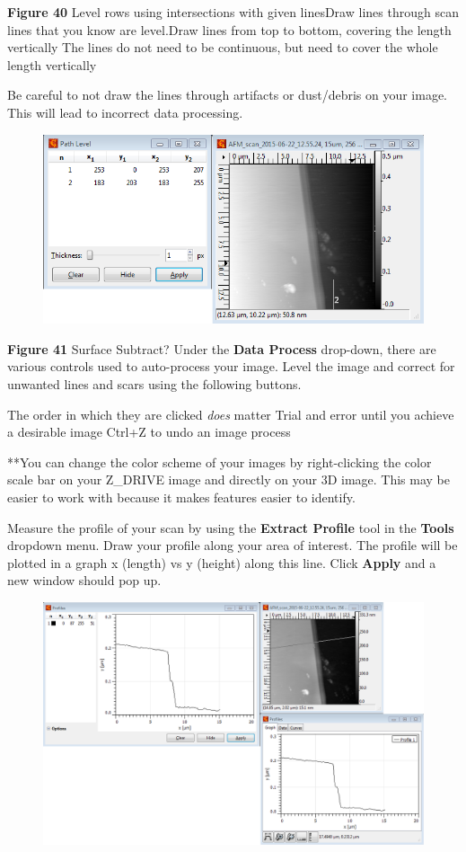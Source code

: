 \documentclass{../lab}
\begin{document}
\textbf{Figure 40}
 Level rows using intersections with given linesDraw lines through scan lines that you know are level.Draw lines from top to bottom, covering the length vertically
The lines do not need to be continuous, but need to cover the whole length vertically

Be careful to not draw the lines through artifacts or dust/debris on your image. This will lead to incorrect data processing.


\begin{figure}[h]
    \centering
    \href{http://dev-physicsadv.pantheon.berkeley.edu/sites/default/files/AFMImages/47.png}{\includegraphics[width=0.5\linewidth]{images/47.png}}
    \caption{}
    \label{fig:47}
\end{figure}


\textbf{Figure 41}
Surface Subtract?
Under the \textbf{Data Process} drop-down, there are various controls used to auto-process your image.  Level the image and correct for unwanted lines and scars using the following buttons.

The order in which they are clicked \emph{does} matter
Trial and error until you achieve a desirable image
Ctrl+Z to undo an image process


**You can change the color scheme of your images by right-clicking the color scale bar on your Z\_DRIVE image and directly on your 3D image.  This may be easier to work with because it makes features easier to identify.

Measure the profile of your scan by using the \textbf{Extract Profile }tool  in the \textbf{Tools} dropdown menu.
Draw your profile along your area of interest.  The profile will be plotted in a graph x (length) vs y (height) along this line. Click \textbf{Apply} and a new window should pop up.


\begin{figure}[h]
    \centering
    \href{http://dev-physicsadv.pantheon.berkeley.edu/sites/default/files/AFMImages/49.png}{\includegraphics[width=0.5\linewidth]{images/49.png}}
    \caption{}
    \label{fig:49}
\end{figure}
\end{document}
